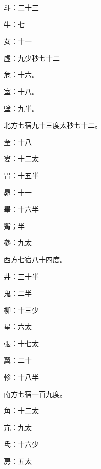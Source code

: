 \begin{pinyinscope}
 斗：二十三



 牛：七



 女：十一



 虛：九少秒七十二



 危：十六。



 室：十八。



 壁：九半。



 北方七宿九十三度太秒七十二。



 奎：十八



 婁：十二太



 胃：十五半



 昴：十一



 畢：十六半



 觜；半



 參：九太



 西方七宿八十四度。



 井：三十半



 鬼：二半



 柳：十三少



 星：六太



 張：十七太



 翼：二十



 軫：十八半



 南方七宿一百九度。



 角：十二太



 亢：九太



 氐：十六少



 房：五太




\end{pinyinscope}
